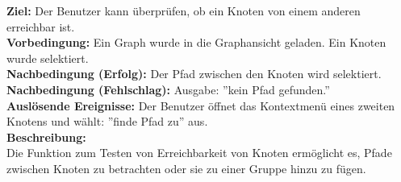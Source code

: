 \label{fa:erreichbarkeit}
\textbf{Ziel:} Der Benutzer kann überprüfen, ob ein Knoten von einem anderen erreichbar ist. \\
\textbf{Vorbedingung:} Ein Graph wurde in die Graphansicht geladen. Ein Knoten wurde selektiert. \\
\textbf{Nachbedingung (Erfolg):} Der Pfad zwischen den Knoten wird selektiert. \\
\textbf{Nachbedingung (Fehlschlag):} Ausgabe: ''kein Pfad gefunden.'' \\
\textbf{Auslösende Ereignisse:} Der Benutzer öffnet das Kontextmenü eines zweiten Knotens und wählt: ''finde Pfad zu'' aus.\\
\textbf{Beschreibung:}\\
Die Funktion zum Testen von Erreichbarkeit von Knoten ermöglicht es, Pfade zwischen Knoten zu betrachten oder sie zu einer Gruppe hinzu zu fügen.\\

%
